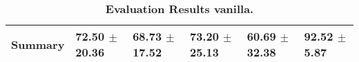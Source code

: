 \begin{table}[htb]
{\begin{tabular}{llllll}
\midrule
\textbf{Summary                                  } &                  \phantom{0}72.50 $\pm$ 20.36 &                      \phantom{0}68.73 $\pm$ 17.52 &                  \phantom{0}73.20 $\pm$ 25.13 &                  \phantom{0}60.69 $\pm$ 32.38 &  \phantom{0}92.52 $\pm$ \phantom{0}5.87 \\
\bottomrule
\end{tabular}%
}
\caption{\textbf{Evaluation Results vanilla.}}
\label{tab:eval-results}
\end{table}



